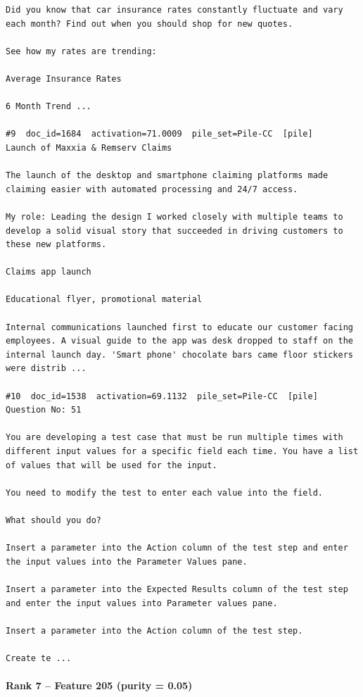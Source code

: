 \begin{verbatim}
Did you know that car insurance rates constantly fluctuate and vary each month? Find out when you should shop for new quotes.

See how my rates are trending:

Average Insurance Rates

6 Month Trend ...

#9  doc_id=1684  activation=71.0009  pile_set=Pile-CC  [pile]
Launch of Maxxia & Remserv Claims

The launch of the desktop and smartphone claiming platforms made claiming easier with automated processing and 24/7 access.

My role: Leading the design I worked closely with multiple teams to develop a solid visual story that succeeded in driving customers to these new platforms.

Claims app launch

Educational flyer, promotional material

Internal communications launched first to educate our customer facing employees. A visual guide to the app was desk dropped to staff on the internal launch day. 'Smart phone' chocolate bars came floor stickers were distrib ...

#10  doc_id=1538  activation=69.1132  pile_set=Pile-CC  [pile]
Question No: 51

You are developing a test case that must be run multiple times with different input values for a specific field each time. You have a list of values that will be used for the input.

You need to modify the test to enter each value into the field.

What should you do?

Insert a parameter into the Action column of the test step and enter the input values into the Parameter Values pane.

Insert a parameter into the Expected Results column of the test step and enter the input values into Parameter values pane.

Insert a parameter into the Action column of the test step.

Create te ...

\end{verbatim}

\paragraph*{Rank 7 -- Feature 205 (purity = 0.05)}

